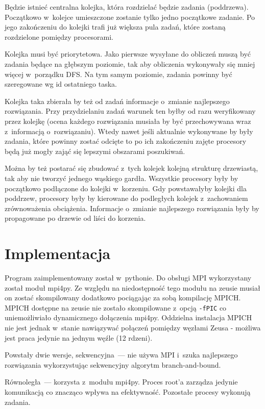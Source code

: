 \documentclass[a4paper; 12pt]{article}
\begin{document}
Będzie istnieć centralna kolejka, która rozdzielać będzie zadania (poddrzewa).
Początkowo w~kolejce umieszczone zostanie tylko jedno początkowe zadanie.
Po jego zakończeniu do kolejki trafi już większa pula zadań, które zostaną
rozdzielone pomiędzy procesorami.

Kolejka musi być priorytetowa.
Jako pierwsze wysyłane do obliczeń muszą być zadania będące na głębszym
poziomie, tak aby obliczenia wykonywały się mniej więcej w~porządku DFS.
Na tym samym poziomie, zadania powinny być szeregowane wg id ostatniego taska.

Kolejka taka zbierała by też od zadań informacje o~zmianie najlepszego
rozwiązania.
Przy przydzielaniu zadań warunek ten byłby od razu weryfikowany przez kolejkę
(ocena każdego rozwiązania musiała by być przechowywana wraz z~informacją
o~rozwiązaniu).
Wtedy nawet jeśli aktualnie wykonywane by były zadania, które powinny zostać
odcięte to po ich zakończeniu zajęte procesory będą już mogły zająć się
lepszymi obszarami poszukiwań.

Można by też postarać się zbudować z~tych kolejek kolejną strukturę drzewiastą,
tak aby nie tworzyć jednego wąskiego gardła.
Wszystkie procesory były by początkowo podłączone do kolejki w~korzeniu.
Gdy powstawałyby kolejki dla poddrzew, procesory były by kierowane do
podległych kolejek z~zachowaniem zrównoważenia obciążenia.
Informacje o~zmianie najlepszego rozwiązania były by propagowane po drzewie od
liści do korzenia.


\section{Implementacja}

Program zaimplementowany został w~pythonie.
Do obsługi MPI wykorzystany został moduł mpi4py.
Ze względu na niedostępność tego modułu na zeusie musiał on zostać skompilowany
dodatkowo pociągając za sobą kompilację MPICH.
MPICH dostępne na zeusie nie zostało skompilowane z~opcją \texttt{-fPIC} co
uniemożliwiało dynamicznego dołączenia mpi4py.
Oddzielna instalacja MPICH nie jest jednak w~stanie nawiązywać połączeń
pomiędzy węzłami Zeusa - możliwa jest praca jedynie na jednym węźle (12
rdzeni).

Powstały dwie wersje, sekwencyjna~--- nie używa MPI i~szuka najlepszego
rozwiązania wykorzystując sekwencyjny algorytm branch-and-bound.

Równoległa~--- korzysta z~modułu mpi4py.
Proces root'a zarządza jedynie komunikacją co znacząco wpływa na efektywność.
Pozostałe procesy wykonują zadania.
\end{document}
